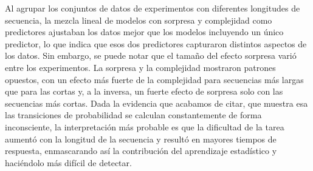 Al agrupar los conjuntos de datos de experimentos con diferentes longitudes de secuencia, la mezcla lineal de modelos con sorpresa y complejidad como predictores ajustaban los datos mejor que los modelos incluyendo un único predictor, lo que indica que esos dos predictores capturaron distintos aspectos de los datos. Sin embargo, se puede notar que el tamaño del efecto sorpresa varió entre los experimentos. La sorpresa y la complejidad mostraron patrones opuestos, con un efecto más fuerte de la complejidad para secuencias más largas que para las cortas y, a la inversa, un fuerte efecto de sorpresa solo con las secuencias más cortas. Dada la evidencia que acabamos de citar, que muestra esa las transiciones de probabilidad se calculan constantemente de forma inconsciente, la interpretación más probable es que la dificultad de la tarea aumentó con la longitud de la secuencia y resultó en mayores tiempos de respuesta, enmascarando así la contribución del aprendizaje estadístico y haciéndolo más difícil de detectar. 

